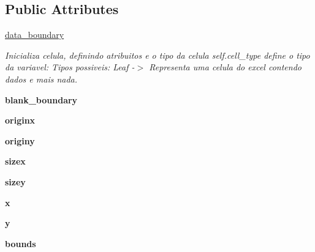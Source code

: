 \subsection*{Public Attributes}
\begin{DoxyCompactItemize}
\item 
\mbox{\hyperlink{class_tabela_1_1_cell_a81d6743175d93342642a052894df99a2}{data\+\_\+boundary}}
\begin{DoxyCompactList}\small\item\em Inicializa celula, definindo atribuitos e o tipo da celula self.\+cell\+\_\+type define o tipo da variavel\+: Tipos possiveis\+: Leaf -\/$>$ Representa uma celula do excel contendo dados e mais nada. \end{DoxyCompactList}\item 
\mbox{\label{class_tabela_1_1_cell_a595c89589e45916787b38d9bbcf41bf7}} 
{\bfseries blank\+\_\+boundary}
\item 
\mbox{\label{class_tabela_1_1_cell_a543900af4f49d7f7dce5be24aaddcd43}} 
{\bfseries originx}
\item 
\mbox{\label{class_tabela_1_1_cell_ac06d52d26c63f8b64c206f3a090bf91b}} 
{\bfseries originy}
\item 
\mbox{\label{class_tabela_1_1_cell_a8e5d57b52807b55546c2443470e0f85f}} 
{\bfseries sizex}
\item 
\mbox{\label{class_tabela_1_1_cell_a226e9b058ada2e873243f45136b2a9ce}} 
{\bfseries sizey}
\item 
\mbox{\label{class_tabela_1_1_cell_a6601b87d017e8dc40c575858bb9aefab}} 
{\bfseries x}
\item 
\mbox{\label{class_tabela_1_1_cell_aec268ed0feba78f5d5affd5b1affbc67}} 
{\bfseries y}
\item 
\mbox{\label{class_tabela_1_1_cell_ad31ac1bf3ec1335d25343f113ef6a564}} 
{\bfseries bounds}
\item 
\mbox{\label{class_tabela_1_1_cell_a822efbac3e8b7c912a2e33ce0d106c84}} 

\end{DoxyCompactItemize}
